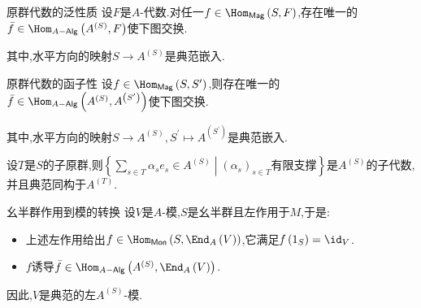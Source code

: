 \begin{proposition}{原群代数的泛性质}{}
	设$F$是$A$-代数.对任一$f\in\Hom_{\mathsf{Mag}}\left(S,F\right)$,存在唯一的$\bar{f}\in\Hom_{A-\mathsf{Alg}}\left(A^{\left(S\right)},F\right)$使下图交换.
	\begin{center}
	\end{center}
	其中,水平方向的映射$S\to A^{\left(S\right)}$是典范嵌入.
\end{proposition}

\begin{corollary}{原群代数的函子性}{}
	设$f\in\Hom_{\mathsf{Mag}}\left(S,S^{\prime}\right)$,则存在唯一的$\bar{f}\in\Hom_{A-\mathsf{Alg}}\left(A^{\left(S\right)},A^{\left(S^{\prime}\right)}\right)$使下图交换.
	\begin{center}
	\end{center}
	其中,水平方向的映射$S\to A^{\left(S\right)},S^{\prime}\mapsto A^{\left(S^{\prime}\right)}$是典范嵌入.
\end{corollary}

\begin{proposition}{}{}
	设$T$是$S$的子原群,则$\left\{\sum\limits_{s\in T}\alpha_{s}e_{s}\in A^{\left(S\right)}\middle|\left(\alpha_{s}\right)_{s\in T}\text{有限支撑}\right\}$是$A^{\left(S\right)}$的子代数,并且典范同构于$A^{\left(T\right)}$.
\end{proposition}

\begin{example}{幺半群作用到模的转换}{}
	设$V$是$A$-模,$S$是幺半群且左作用于$M$,于是:
	\begin{itemize}
		\item 上述左作用给出$f\in\Hom_{\mathsf{Mon}}\left(S,\End_{A}\left(V\right)\right)$,它满足$f\left(1_{S}\right)=\id_{V}$.
		\item $f$诱导$\bar{f}\in\Hom_{A-\mathsf{Alg}}\left(A^{\left(S\right)},\End_{A}\left(V\right)\right)$.
	\end{itemize}
	因此,$V$是典范的左$A^{\left(S\right)}$-模.
\end{example}


